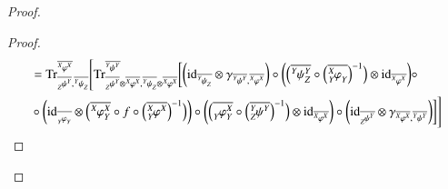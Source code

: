 \documentclass{amsart}
\def\tn{\textnormal}
\def\Trace{\tn{Tr}}
\def\ol{\overline}
\def\id{\tn{id}}
\newcommand{\feeddd}[3]{{\tensor*[^{#2}_{\color{white}{!}}]{{#1}}{^{#3}}}}%
\newcommand{\feeddc}[3]{{\tensor*[^{#2}]{{#1}}{_{#3}}}}
\newcommand{\feedcd}[3]{{\tensor*[_{#2}]{{#1}}{^{#3}}}}
\newcommand{\feedcc}[3]{{\tensor*[^{\color{white}{!}}_{#2}]{{#1}}{_{#3}}}}
\newcommand{\feedda}[3]{{\tensor*[^{#2}_{\color{white}{!}}]{{#1}}{^{#2}_{#3}}}}
\newcommand{\feedca}[3]{{\tensor*[_{#2}]{{#1}}{_{#2}^{#3}}}}
\newcommand{\feedad}[3]{{\tensor*[^{#2}_{#3}]{{#1}}{^{#2}}}}
\newcommand{\feedac}[3]{{\tensor*[_{#2}^{#3}]{{#1}}{_{#2}}}}
\theoremstyle{remark}
\theoremstyle{definition}
\begin{document}
\begin{proof}
\begin{proof}
\begin{align*}
&=\Trace^{\ol{\feeddd{\varphi}{X}{X}}}_{\ol{\feedcd{\psi}{Z}{Y}},\ol{\feeddc{\psi}{Y}{Z}}}\Bigg[
\Trace^{\ol{\feeddd{\psi}{Y}{Y}}}_{\ol{\feedcd{\psi}{Z}{Y}}\otimes\ol{\feeddd{\varphi}{X}{X}},\ol{\feeddc{\psi}{Y}{Z}}\otimes\ol{\feeddd{\varphi}{X}{X}}}\bigg[
\bigg(\id_{\ol{\feeddc{\psi}{Y}{Z}}}\otimes\gamma_{\ol{\feeddd{\psi}{Y}{Y}},\ol{\feeddd{\varphi}{X}{X}}}\bigg)\circ\bigg(\Big(\ol{\feedda{\psi}{Y}{Z}}\circ\Big(\ol{\feedac{\varphi}{Y}{X}}\Big)^{-1}\Big)\otimes\id_{\ol{\feeddd{\varphi}{X}{X}}}\bigg)\circ\\
&\circ\bigg(\id_{\ol{\feedcc{\varphi}{Y}{Y}}}\otimes\Big(\ol{\feedda{\varphi}{X}{Y}}\circ f\circ\Big(\ol{\feedad{\varphi}{X}{Y}}\Big)^{-1}\Big)\bigg)\circ\bigg(\Big(\ol{\feedca{\varphi}{Y}{X}}\circ\Big(\ol{\feedad{\psi}{Y}{Z}}\Big)^{-1}\Big)\otimes\id_{\ol{\feeddd{\varphi}{X}{X}}}\bigg)\circ\bigg(\id_{\ol{\feedcd{\psi}{Z}{Y}}}\otimes\gamma_{\ol{\feeddd{\varphi}{X}{X}},\ol{\feeddd{\psi}{Y}{Y}}}\bigg)\bigg]\Bigg]\\
\end{align*}


\end{proof}
\end{proof}
\end{document}
